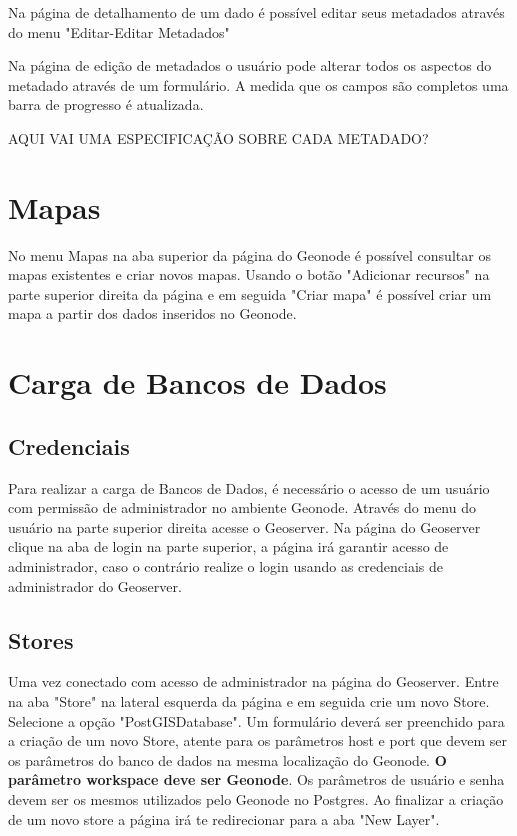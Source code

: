 \documentclass[12pt]{article}
\begin{document}
Na página de detalhamento de um dado é possível editar seus metadados
através do menu "Editar-Editar Metadados"

Na página de edição de metadados o usuário pode alterar todos os aspectos do
metadado através de um formulário. A medida que os campos são completos uma
barra de progresso é atualizada. 

AQUI VAI UMA ESPECIFICAÇÃO SOBRE CADA METADADO?

\section{Mapas}

No menu Mapas na aba superior da página do Geonode é possível consultar os
mapas existentes e criar novos mapas. Usando o botão "Adicionar recursos" na
parte superior direita da página e em seguida "Criar mapa" é possível criar um
mapa a partir dos dados inseridos no Geonode.

\section{Carga de Bancos de Dados}

\subsection{Credenciais}
Para realizar a carga de Bancos de Dados, é necessário o acesso de um usuário
com permissão de administrador no ambiente Geonode. Através do menu do usuário
na parte superior direita acesse o Geoserver. Na página do Geoserver clique na
aba de login na parte superior, a página irá garantir acesso de administrador,
caso o contrário realize o login usando as credenciais de administrador do
Geoserver.

\subsection{Stores}
Uma vez conectado com acesso de administrador na página do Geoserver. Entre na
aba "Store" na lateral esquerda da página e em seguida crie um novo Store.
Selecione a opção "PostGISDatabase". Um formulário deverá ser preenchido para a
criação de um novo Store, atente para os parâmetros host e port que devem ser
os parâmetros do banco de dados na mesma localização do Geonode. \textbf{O
parâmetro workspace deve ser Geonode}. Os parâmetros de usuário e senha devem
ser os mesmos utilizados pelo Geonode no Postgres. Ao finalizar a criação de um
novo store a página irá te redirecionar para a aba "New Layer".
\end{document}
